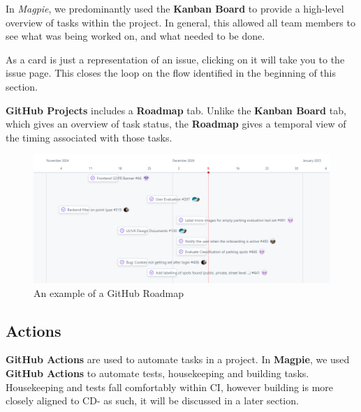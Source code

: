 In \textit{Magpie}, we predominantly used the \textbf{Kanban Board} to provide a
high-level overview of tasks within the project. In general, this allowed all
team members to see what was being worked on, and what needed to be done.

As a card is just a representation of an issue, clicking on it will take you to
the issue page. This closes the loop on the flow identified in the beginning of
this section.

\textbf{GitHub Projects} includes a \textbf{Roadmap} tab. Unlike the
\textbf{Kanban Board} tab, which gives an overview of task status, the
\textbf{Roadmap} gives a temporal view of the timing associated with those
tasks.

\begin{figure}[h]
    \centering{}
    \includegraphics[width=\textwidth]{images/github_roadmap.png}
    \caption{An example of a GitHub Roadmap}
\end{figure}

\newpage{}

\subsection{Actions}
\textbf{GitHub Actions} are used to automate tasks in a project. In
\textbf{Magpie}, we used \textbf{GitHub Actions} to automate tests, housekeeping
and building tasks. Housekeeping and tests fall comfortably within CI, however
building is more closely aligned to CD- as such, it will be discussed in a later
section.

